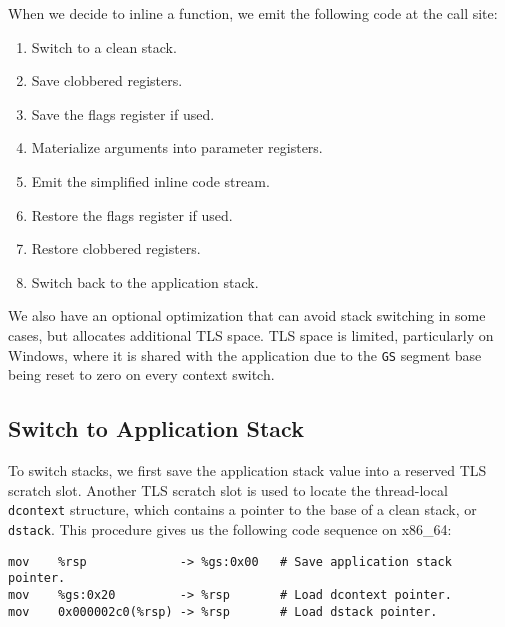

When we decide to inline a function, we emit the following code at the call
site:

\begin{enumerate}
\item Switch to a clean stack.
\item Save clobbered registers.
\item Save the flags register if used.
\item Materialize arguments into parameter registers.
\item Emit the simplified inline code stream.
\item Restore the flags register if used.
\item Restore clobbered registers.
\item Switch back to the application stack.
\end{enumerate}

We also have an optional optimization that can avoid stack switching in some
cases, but allocates additional TLS space.  TLS space is limited, particularly
on Windows, where it is shared with the application due to the {\tt GS} segment
base being reset to zero on every context switch.


\subsection{Switch to Application Stack}

To switch stacks, we first save the application stack value into a reserved TLS
scratch slot.  Another TLS scratch slot is used to locate the thread-local {\tt
dcontext} structure, which contains a pointer to the base of a clean stack, or
{\tt dstack}.  This procedure gives us the following code sequence on x86\_64:

\begin{verbatim}
mov    %rsp             -> %gs:0x00   # Save application stack pointer.
mov    %gs:0x20         -> %rsp       # Load dcontext pointer.
mov    0x000002c0(%rsp) -> %rsp       # Load dstack pointer.
\end{verbatim}

